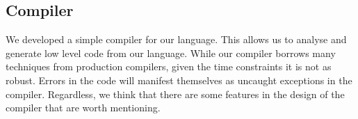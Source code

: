 \subsection{Compiler}

We developed a simple compiler for our language.
This allows us to 	
	analyse and generate low level code from our language.
While our compiler borrows many techniques from production compilers,
	given the time constraints it is not as robust.
Errors in the code will manifest themselves as uncaught exceptions
	in the compiler.
Regardless, we think that there are some features in the design of
	the compiler that are worth mentioning. 






